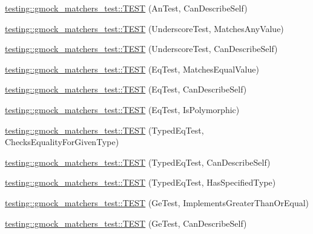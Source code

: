 \begin{DoxyCompactItemize}
\item 
\mbox{\hyperlink{namespacetesting_1_1gmock__matchers__test_ac3b18688ca5b5cf2d6137ce3e7397691}{testing\+::gmock\+\_\+matchers\+\_\+test\+::\+T\+E\+ST}} (An\+Test, Can\+Describe\+Self)
\item 
\mbox{\hyperlink{namespacetesting_1_1gmock__matchers__test_a3fc77fa5ca709ef70963026fd7114552}{testing\+::gmock\+\_\+matchers\+\_\+test\+::\+T\+E\+ST}} (Underscore\+Test, Matches\+Any\+Value)
\item 
\mbox{\hyperlink{namespacetesting_1_1gmock__matchers__test_a25ae831c15c9ca918ed847ba147ac572}{testing\+::gmock\+\_\+matchers\+\_\+test\+::\+T\+E\+ST}} (Underscore\+Test, Can\+Describe\+Self)
\item 
\mbox{\hyperlink{namespacetesting_1_1gmock__matchers__test_a2ac5d4c2fae3e7f2e6c6be657a61f86a}{testing\+::gmock\+\_\+matchers\+\_\+test\+::\+T\+E\+ST}} (Eq\+Test, Matches\+Equal\+Value)
\item 
\mbox{\hyperlink{namespacetesting_1_1gmock__matchers__test_a1c86e845cb44f34eeac4863041c871c6}{testing\+::gmock\+\_\+matchers\+\_\+test\+::\+T\+E\+ST}} (Eq\+Test, Can\+Describe\+Self)
\item 
\mbox{\hyperlink{namespacetesting_1_1gmock__matchers__test_ac3ea755ba2a8bb480cee70aa37ccafc2}{testing\+::gmock\+\_\+matchers\+\_\+test\+::\+T\+E\+ST}} (Eq\+Test, Is\+Polymorphic)
\item 
\mbox{\hyperlink{namespacetesting_1_1gmock__matchers__test_a3e8d6cc259c1410a85572bc773bb21b9}{testing\+::gmock\+\_\+matchers\+\_\+test\+::\+T\+E\+ST}} (Typed\+Eq\+Test, Checks\+Equality\+For\+Given\+Type)
\item 
\mbox{\hyperlink{namespacetesting_1_1gmock__matchers__test_a9baf261536023ac58ed65cdafcaf1602}{testing\+::gmock\+\_\+matchers\+\_\+test\+::\+T\+E\+ST}} (Typed\+Eq\+Test, Can\+Describe\+Self)
\item 
\mbox{\hyperlink{namespacetesting_1_1gmock__matchers__test_ae0255a5de2ef537512379c3f8ff9e34f}{testing\+::gmock\+\_\+matchers\+\_\+test\+::\+T\+E\+ST}} (Typed\+Eq\+Test, Has\+Specified\+Type)
\item 
\mbox{\hyperlink{namespacetesting_1_1gmock__matchers__test_a7d73fdbbee36ccf241ec6e328175655b}{testing\+::gmock\+\_\+matchers\+\_\+test\+::\+T\+E\+ST}} (Ge\+Test, Implements\+Greater\+Than\+Or\+Equal)
\item 
\mbox{\hyperlink{namespacetesting_1_1gmock__matchers__test_a2718c8d5456b62ab7b060b2723939a72}{testing\+::gmock\+\_\+matchers\+\_\+test\+::\+T\+E\+ST}} (Ge\+Test, Can\+Describe\+Self)
\item 

\end{DoxyCompactItemize}
